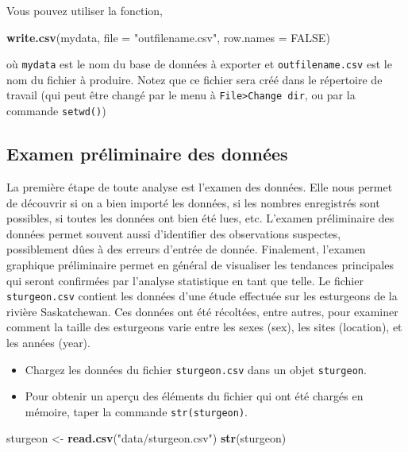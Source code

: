 \documentclass[12pt,]{book}
\newenvironment{Shaded}{\begin{snugshade}}{\end{snugshade}}
\newcommand{\DataTypeTok}[1]{\textcolor[rgb]{0.13,0.29,0.53}{#1}}
\newcommand{\KeywordTok}[1]{\textcolor[rgb]{0.13,0.29,0.53}{\textbf{#1}}}
\newcommand{\NormalTok}[1]{#1}
\newcommand{\OtherTok}[1]{\textcolor[rgb]{0.56,0.35,0.01}{#1}}
\newcommand{\StringTok}[1]{\textcolor[rgb]{0.31,0.60,0.02}{#1}}
\providecommand{\tightlist}{%
  \setlength{\itemsep}{0pt}\setlength{\parskip}{0pt}}
\begin{document}
Vous pouvez utiliser la fonction,

\begin{Shaded}
\begin{Highlighting}[]
  \KeywordTok{write.csv}\NormalTok{(mydata, }\DataTypeTok{file =} \StringTok{"outfilename.csv"}\NormalTok{, }\DataTypeTok{row.names =} \OtherTok{FALSE}\NormalTok{)}
\end{Highlighting}
\end{Shaded}

où \texttt{mydata} est le nom du base de données à exporter et \texttt{outfilename.csv} est le nom du fichier à produire.
Notez que ce fichier sera créé dans le répertoire de travail (qui peut être changé par le menu à \texttt{File\textgreater{}Change\ dir}, ou par la commande \texttt{setwd()})

\hypertarget{examen-pruxe9liminaire-des-donnuxe9es}{%
\subsection{Examen préliminaire des données}\label{examen-pruxe9liminaire-des-donnuxe9es}}

La première étape de toute analyse est l'examen des données.
Elle nous permet de découvrir si on a bien importé les données, si les nombres enregistrés sont possibles, si toutes les données ont bien été lues, etc.
L'examen préliminaire des données permet souvent aussi d'identifier des observations suspectes, possiblement dûes à des erreurs d'entrée de donnée.
Finalement, l'examen graphique préliminaire permet en général de visualiser les tendances principales qui seront confirmées par l'analyse statistique en tant que telle.
Le fichier \texttt{sturgeon.csv} contient les données d'une étude effectuée sur les esturgeons de la rivière Saskatchewan.
Ces données ont été récoltées, entre autres, pour examiner comment la taille des esturgeons varie entre les sexes (sex), les sites (location), et les années (year).

\begin{itemize}
\tightlist
\item
  Chargez les données du fichier \texttt{sturgeon.csv} dans un objet \texttt{sturgeon}.
\item
  Pour obtenir un aperçu des éléments du fichier qui ont été chargés en mémoire, taper la commande \texttt{str(sturgeon)}.
\end{itemize}

\begin{Shaded}
\begin{Highlighting}[]
\NormalTok{sturgeon <-}\StringTok{ }\KeywordTok{read.csv}\NormalTok{(}\StringTok{"data/sturgeon.csv"}\NormalTok{)}
\KeywordTok{str}\NormalTok{(sturgeon)}
\end{Highlighting}
\end{Shaded}
\end{document}
